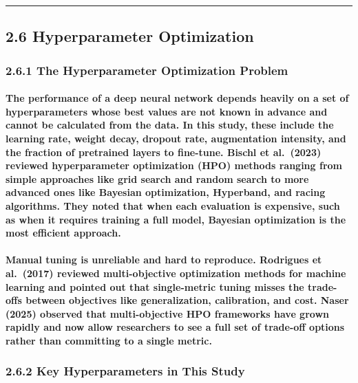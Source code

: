 \begin{center}\rule{0.5\linewidth}{0.5pt}\end{center}

\subsection{2.6 Hyperparameter
Optimization}\label{hyperparameter-optimization}

\subsubsection{2.6.1 The Hyperparameter Optimization
Problem}\label{the-hyperparameter-optimization-problem}

\paragraph{The performance of a deep neural network depends heavily on a set of hyperparameters whose best values are not known in advance and cannot be calculated from the data. In this study, these include the learning rate, weight decay, dropout rate, augmentation intensity, and the fraction of pretrained layers to fine-tune. Bischl et al. (2023) reviewed hyperparameter optimization (HPO) methods ranging from simple approaches like grid search and random search to more advanced ones like Bayesian optimization, Hyperband, and racing algorithms. They noted that when each evaluation is expensive, such as when it requires training a full model, Bayesian optimization is the most efficient approach.}

\paragraph{Manual tuning is unreliable and hard to reproduce. Rodrigues et al. (2017) reviewed multi-objective optimization methods for machine learning and pointed out that single-metric tuning misses the trade-offs between objectives like generalization, calibration, and cost. Naser (2025) observed that multi-objective HPO frameworks have grown rapidly and now allow researchers to see a full set of trade-off options rather than committing to a single metric.}

\subsubsection{2.6.2 Key Hyperparameters in This
Study}\label{key-hyperparameters-in-this-study}

